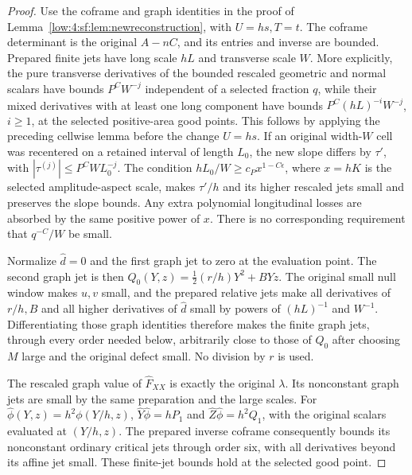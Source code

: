 \documentclass[11pt]{amsart}
\theoremstyle{definition}
\theoremstyle{remark}
\numberwithin{equation}{section}
\begin{document}
\begin{proof}
Use the coframe and graph identities in the proof of Lemma~\ref{low:4:sf:lem:newreconstruction}, with $U=hs,T=t$. The coframe determinant is the original $A-nC$, and its entries and inverse are bounded. Prepared finite jets have long scale $hL$ and transverse scale $W$. More explicitly, the pure transverse derivatives of the bounded rescaled geometric and normal scalars have bounds $P^CW^{-j}$ independent of a selected fraction $q$, while their mixed derivatives with at least one long component have bounds $P^C(hL)^{-i}W^{-j}$, $i\ge1$, at the selected positive-area good points. This follows by applying the preceding cellwise lemma before the change $U=hs$. If an original width-$W$ cell was recentered on a retained interval of length $L_0$, the new slope differs by $\tau'$, with $|\tau^{(j)}|\le P^CW L_0^{-j}$. The condition $hL_0/W\ge c_Px^{1-C\epsilon}$, where $x=hK$ is the selected amplitude-aspect scale, makes $\tau'/h$ and its higher rescaled jets small and preserves the slope bounds. Any extra polynomial longitudinal losses are absorbed by the same positive power of $x$. There is no corresponding requirement that $q^{-C}/W$ be small.

Normalize $\widehat d=0$ and the first graph jet to zero at the evaluation point. The second graph jet is then $Q_0(Y,z)=\tfrac12(r/h)Y^2+BYz$. The original small null window makes $u,v$ small, and the prepared relative jets make all derivatives of $r/h,B$ and all higher derivatives of $\widehat d$ small by powers of $(hL)^{-1}$ and $W^{-1}$. Differentiating those graph identities therefore makes the finite graph jets, through every order needed below, arbitrarily close to those of $Q_0$ after choosing $M$ large and the original defect small. No division by $r$ is used.

The rescaled graph value of $\widehat F_{XX}$ is exactly the original $\lambda$. Its nonconstant graph jets are small by the same preparation and the large scales. For $\widehat\phi(Y,z)=h^2\phi(Y/h,z)$, $\widehat Y\widehat\phi=hP_1$ and $\widehat Z\widehat\phi=h^2Q_1$, with the original scalars evaluated at $(Y/h,z)$. The prepared inverse coframe consequently bounds its nonconstant ordinary critical jets through order six, with all derivatives beyond its affine jet small. These finite-jet bounds hold at the selected good point.


\end{proof}
\end{document}
